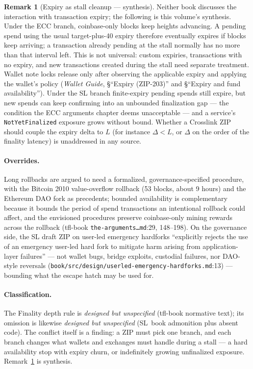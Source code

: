 \documentclass[11pt,a4paper]{article}
\theoremstyle{definition}
\newtheorem{remark}[theorem]{Remark}
\begin{document}
\begin{remark}[Expiry as stall cleanup --- synthesis]
\label{rem:xl-stall-expiry}
Neither book discusses the interaction with transaction expiry; the
following is this volume's synthesis. Under the ECC branch,
coinbase-only blocks keep heights advancing. A pending spend using the
usual target-plus-40 expiry therefore eventually expires if blocks keep
arriving; a transaction already pending at the stall normally has no
more than that interval left. This is not universal: custom expiries,
transactions with no expiry, and new transactions created during the
stall need separate treatment. Wallet note locks release only after
observing the applicable expiry and applying the wallet's policy
(\emph{Wallet Guide},
\S``Expiry (ZIP-203)'' and \S``Expiry and fund availability''). Under the
SL branch finite-expiry pending spends still expire, but new spends can
keep confirming into an unbounded finalization gap --- the condition the
ECC arguments
chapter deems unacceptable --- and a service's
\texttt{NotYetFinalized} exposure grows without bound. Whether a
Crosslink ZIP should couple the expiry delta to $L$ (for instance
$\Delta < L$, or $\Delta$ on the order of the finality latency) is
unaddressed in any source.
\end{remark}

\paragraph{Overrides.} Long rollbacks are argued to need a formalized,
governance-specified procedure, with the Bitcoin 2010 value-overflow
rollback (53 blocks, about 9 hours) and the Ethereum DAO fork as
precedents; bounded availability is complementary because it bounds the
period of spend transactions an intentional rollback could affect, and
the envisioned procedures preserve coinbase-only mining rewards across
the rollback (tfl-book \texttt{the-arguments\ldots{}md}:29, 148--198).
On the governance side, the SL draft ZIP on user-led emergency hardforks
``explicitly rejects the use of an emergency user-led hard fork to
mitigate harm arising from application-layer failures'' --- not wallet
bugs, bridge exploits, custodial failures, nor DAO-style reversals
(\texttt{book/src/design/userled-emergency-hardforks.md}:13) --- bounding
what the escape hatch may be used for.

\paragraph{Classification.} The Finality depth rule is \emph{designed but
unspecified} (tfl-book normative text); its omission is likewise
\emph{designed but unspecified} (SL~book admonition plus absent code).
The conflict itself is a finding: a ZIP must pick one branch, and each
branch changes what wallets and exchanges must handle during a stall ---
a hard availability stop with expiry churn, or indefinitely growing
unfinalized exposure. Remark~\ref{rem:xl-stall-expiry} is synthesis.
\end{document}
